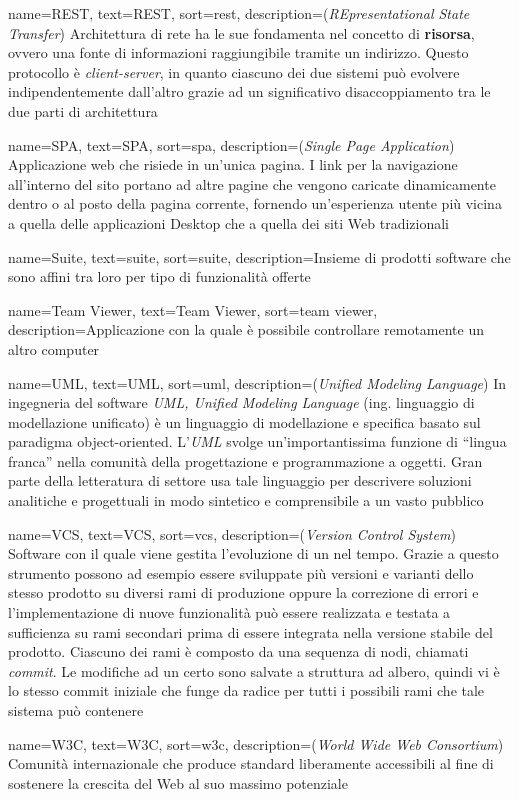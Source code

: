 {
    name={REST},
    text=REST,
    sort=rest,
    description={(\emph{REpresentational State Transfer}) Architettura di rete ha le sue fondamenta nel concetto di \textbf{risorsa}, ovvero una fonte di informazioni raggiungibile tramite un indirizzo. Questo protocollo è \emph{client-server}, in quanto ciascuno dei due sistemi può evolvere indipendentemente dall'altro grazie ad un significativo disaccoppiamento tra le due parti di architettura}
}

{
    name={SPA},
    text=SPA,
    sort=spa,
    description={(\emph{Single Page Application}) Applicazione web che risiede in un'unica pagina. I link per la navigazione all'interno del sito portano ad altre pagine che vengono caricate dinamicamente dentro o al posto della pagina corrente, fornendo un'esperienza utente più vicina a quella delle applicazioni Desktop che a quella dei siti Web tradizionali}
}

{
    name={Suite},
    text=suite,
    sort=suite,
    description={Insieme di prodotti software che sono affini tra loro per tipo di funzionalità offerte}
}

{
    name={Team Viewer},
    text=Team Viewer,
    sort=team viewer,
    description={Applicazione con la quale è possibile controllare remotamente un altro computer}
}

{
    name={UML},
    text=UML,
    sort=uml,
    description={(\emph{Unified Modeling Language}) In ingegneria del software \emph{UML, Unified Modeling Language} (ing. linguaggio di modellazione unificato) è un linguaggio di modellazione e specifica basato sul paradigma object-oriented. L'\emph{UML} svolge un'importantissima funzione di ``lingua franca'' nella comunità della progettazione e programmazione a oggetti. Gran parte della letteratura di settore usa tale linguaggio per descrivere soluzioni analitiche e progettuali in modo sintetico e comprensibile a un vasto pubblico}
}

{
    name={VCS},
    text=VCS,
    sort=vcs,
    description={(\emph{Version Control System}) Software con il quale viene gestita l'evoluzione di un  nel tempo. Grazie a questo strumento possono ad esempio essere sviluppate più versioni e varianti dello stesso prodotto su diversi rami di produzione oppure la correzione di errori e l'implementazione di nuove funzionalità può essere realizzata e testata a sufficienza su rami secondari prima di essere integrata nella versione stabile del prodotto.
    Ciascuno dei rami è composto da una sequenza di nodi, chiamati \emph{commit}. Le modifiche ad un certo  sono salvate a struttura ad albero, quindi vi è lo stesso commit iniziale che funge da radice per tutti i possibili rami che tale sistema può contenere}
}

{
    name={W3C},
    text=W3C,
    sort=w3c,
    description={(\emph{World Wide Web Consortium}) Comunità internazionale che produce standard liberamente accessibili al fine di sostenere la crescita del Web al suo massimo potenziale}
}
